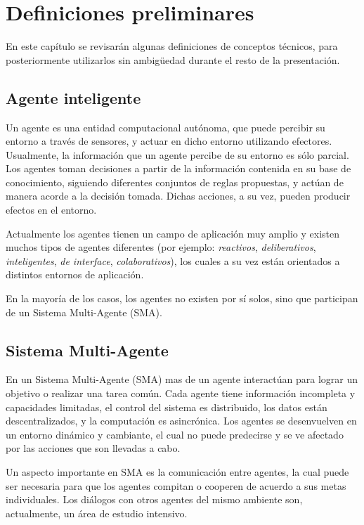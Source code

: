 
\chapter{Definiciones preliminares} 
\label{chap:definiciones_preliminares}

En este capítulo se revisarán algunas definiciones de conceptos
técnicos, para posteriormente utilizarlos sin ambigüedad durante el
resto de la presentación.

\section{Agente inteligente}
\label{sec:agente_inteligente}

Un agente es una entidad computacional autónoma, que puede percibir su
entorno a través de sensores, y actuar en dicho entorno utilizando
efectores.
Usualmente, la información que un agente percibe de su entorno es sólo
parcial.
Los agentes toman decisiones a partir de la información contenida en
su base de conocimiento, siguiendo diferentes conjuntos de reglas
propuestas, y actúan de manera acorde a la decisión tomada.
Dichas acciones, a su vez, pueden producir efectos en el entorno.

Actualmente los agentes tienen un campo de aplicación muy amplio y
existen muchos tipos de agentes diferentes (por ejemplo:
\textit{reactivos}, \textit{deliberativos}, \textit{inteligentes},
\textit{de interface}, \textit{colaborativos}), los cuales a su vez
están orientados a distintos entornos de aplicación.

En la mayoría de los casos, los agentes no existen por sí solos, sino
que participan de un Sistema Multi-Agente (SMA).

\section{Sistema Multi-Agente}
\label{sec:sistema_multiagente}

En un Sistema Multi-Agente (SMA) mas de un agente interactúan para
lograr un objetivo o realizar una tarea común.
Cada agente tiene información incompleta y capacidades limitadas, el
control del sistema es distribuido, los datos están descentralizados,
y la computación es asincrónica.
Los agentes se desenvuelven en un entorno dinámico y cambiante, el
cual no puede predecirse y se ve afectado por las acciones que son
llevadas a cabo.

Un aspecto importante en SMA es la comunicación entre agentes, la cual
puede ser necesaria para que los agentes compitan o cooperen de
acuerdo a sus metas individuales. 
Los diálogos con otros agentes del mismo ambiente son, actualmente, un
área de estudio intensivo.
